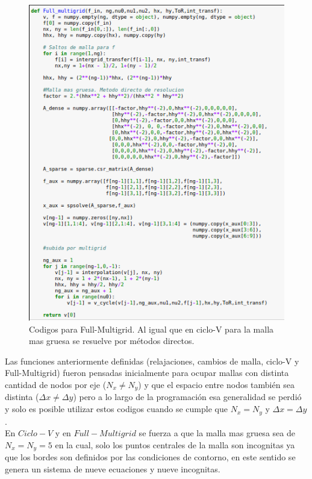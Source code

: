 \documentclass[letter,10pt]{article}
\begin{document}
\begin{figure}[H]
\centering
\includegraphics[scale=1.3]{img/multigridcode}
\caption{Codigos para Full-Multigrid. Al igual que en ciclo-V para la malla mas gruesa se resuelve por métodos directos.}
\label{multigridcode}
\end{figure}

Las funciones anteriormente definidas (relajaciones, cambios de malla, ciclo-V y Full-Multigrid) fueron pensadas inicialmente para ocupar mallas con distinta cantidad de nodos por eje ($N_x \neq N_y$) y que el espacio entre nodos también sea distinta ($\Delta x \neq \Delta y$) pero a lo largo de la programación esa generalidad se perdió y solo es posible utilizar estos codigos cuando se cumple que $N_x = N_y$ y $\Delta x = \Delta y$.\\

En $Ciclo-V$ y en $Full-Multigrid$ se fuerza a que la malla mas gruesa sea de $N_x=N_y=5$ en la cual, solo los puntos centrales de la malla son incognitas ya que los bordes son definidos por las condiciones de contorno, en este sentido se genera un sistema de nueve ecuaciones y nueve incognitas.\\
\end{document}
